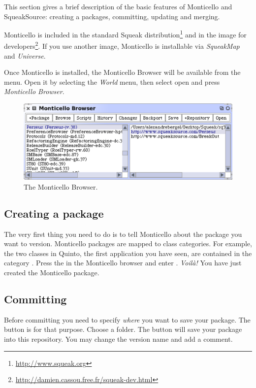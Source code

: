 \documentclass[a4paper,10pt,twoside]{book}
\begin{document}
This section gives a brief description of the basic features of Monticello and SqueakSource: creating a packages, committing, updating and merging.

Monticello is included in the standard Squeak distribution\footnote{\url{http://www.squeak.org}} and in the image for developers\footnote{\url{http://damien.cassou.free.fr/squeak-dev.html}}. If you use another image, Monticello is installable via \emph{SqueakMap} and \emph{Universe}.

Once Monticello is installed, the Monticello Browser will be available from the  menu. Open it by selecting the \emph{World} menu, then select open and press \emph{Monticello Browser}.

\begin{figure}[ht]\centering
	\includegraphics[width=.75\linewidth]{monticello.png}
	\caption{The Monticello Browser.}
\end{figure}

\subsection{Creating a package}

The very first thing you need to do is to tell Monticello about the package you want to version. Monticello packages are mapped to class categories. For example, the two classes in Quinto, the first application you have seen, are contained in the category . Press the  in the Monticello browser and enter . \emph{Voil\`a!} You have just created the  Monticello package. 

\subsection{Committing}

Before committing you need to specify \emph{where} you want to save your package. The  button is for that purpose. Choose a folder. The  button will save your package into this repository. You may change the version name and add a comment. 
\end{document}
